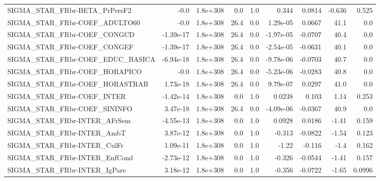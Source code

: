 \begin{tabular}{lrrrrrrrr}
SIGMA\_STAR\_FRbr-BETA\_PrPersF2         &        -0.0 &     1.8e+308 &     0.0 &      1.0 &      0.344 &      0.0814 &       -0.636 &         0.525 \\
SIGMA\_STAR\_FRbr-COEF\_ADULTO60         &        -0.0 &     1.8e+308 &    26.4 &      0.0 &   1.29e-05 &      0.0667 &         41.1 &           0.0 \\
SIGMA\_STAR\_FRbr-COEF\_CONGCD           &   -1.39e-17 &     1.8e+308 &    26.4 &      0.0 &  -1.97e-05 &     -0.0707 &         40.4 &           0.0 \\
SIGMA\_STAR\_FRbr-COEF\_CONGEF           &   -1.39e-17 &     1.8e+308 &    26.4 &      0.0 &  -2.54e-05 &     -0.0631 &         40.1 &           0.0 \\
SIGMA\_STAR\_FRbr-COEF\_EDUC\_BASICA      &   -6.94e-18 &     1.8e+308 &    26.4 &      0.0 &  -9.78e-06 &     -0.0703 &         40.7 &           0.0 \\
SIGMA\_STAR\_FRbr-COEF\_HORAPICO         &        -0.0 &     1.8e+308 &    26.4 &      0.0 &  -5.23e-06 &     -0.0283 &         40.8 &           0.0 \\
SIGMA\_STAR\_FRbr-COEF\_HORASTRAB        &    1.73e-18 &     1.8e+308 &    26.4 &      0.0 &   9.79e-07 &      0.0297 &         41.0 &           0.0 \\
SIGMA\_STAR\_FRbr-COEF\_INTER            &   -1.42e-14 &     1.8e+308 &     0.0 &      1.0 &     0.0238 &       0.103 &         1.14 &         0.253 \\
SIGMA\_STAR\_FRbr-COEF\_SININFO          &    3.47e-18 &     1.8e+308 &    26.4 &      0.0 &  -4.09e-06 &     -0.0367 &         40.9 &           0.0 \\
SIGMA\_STAR\_FRbr-INTER\_AFrSem          &   -4.55e-13 &     1.8e+308 &     0.0 &      1.0 &     0.0928 &      0.0186 &        -1.41 &         0.159 \\
SIGMA\_STAR\_FRbr-INTER\_AmbT            &    3.87e-12 &     1.8e+308 &     0.0 &      1.0 &     -0.313 &     -0.0822 &        -1.54 &         0.123 \\
SIGMA\_STAR\_FRbr-INTER\_CulFr           &    1.09e-11 &     1.8e+308 &     0.0 &      1.0 &      -1.22 &      -0.116 &         -1.4 &         0.162 \\
SIGMA\_STAR\_FRbr-INTER\_EnfCond         &   -2.73e-12 &     1.8e+308 &     0.0 &      1.0 &     -0.326 &     -0.0544 &        -1.41 &         0.157 \\
SIGMA\_STAR\_FRbr-INTER\_IgPare          &    3.18e-12 &     1.8e+308 &     0.0 &      1.0 &     -0.356 &     -0.0722 &        -1.65 &        0.0996 \\

\end{tabular}
